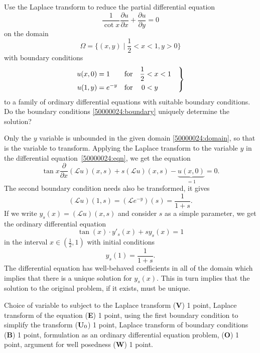 Use the Laplace transform to reduce the partial differential equation
\begin{equation}
\frac{1}{\cot x}
\frac{\partial u}{\partial x}
+
\frac{\partial u}{\partial y}
=
0
\label{50000024:eqn}
\end{equation}
on the domain
\begin{equation}
\Omega
=
\biggl\{
(x,y)\;\bigg|\; \frac12<x<1, y>0
\biggr\}
\label{50000024:domain}
\end{equation}
with boundary conditions
\begin{equation}
\left.
\begin{aligned}
u(x,0) &= 1 &&\text{for} & \frac12<\mathstrut&x<1
\\
u(1,y) &=e^{-y}&&\text{for}  & 0<\mathstrut&y
\end{aligned}
\quad
\right\}
\label{50000024:boundary}
\end{equation}
to a family of ordinary differential equations with suitable boundary
conditions.
Do the boundary conditions \eqref{50000024:boundary} uniquely determine
the solution?

\begin{loesung}
Only the $y$ variable is unbounded in the given domain
\eqref{50000024:domain}, so that is the variable to transform.
Applying the Laplace transform to the variable $y$ in the differential
equation~\eqref{50000024:eqn}, we get the equation
\[
\tan x \frac{\partial }{\partial x}
(\mathscr{L}u)(x,s)
+
s(\mathscr{L}u)(x,s)
-
\underbrace{u(x,0)}_{\displaystyle=1}
=0.
\]
The second boundary condition needs also be transformed, it gives
\[
(\mathscr{L}u)(1,s)
=
(\mathscr{L}e^{-y})(s)
=
\frac{1}{1+s}.
\]
If we write $y_s(x)=(\mathscr{L}u)(x,s)$ and consider $s$ as a simple
parameter, we get the ordinary differential equation
\begin{equation}
\tan(x)
\cdot
y'_s(x) 
+sy_s(x)
=
1
\end{equation}
in the interval $x\in(\frac12,1)$ with initial conditions
\[
y_s(1)
=
\frac{1}{1+s}.
\]
The differential equation has well-behaved coefficients in all of the
domain which implies that there is a unique solution for $y_s(x)$.
This in turn implies that the solution to the original problem, if it
exists, must be unique.
\end{loesung}

\begin{bewertung}
Choice of variable to subject to the Laplace transform ({\bf V}) 1 point,
Laplace transform of the equation ({\bf E}) 1 point,
using the first boundary condition to simplify the transform
({\bf U}$\mathstrut_0$) 1 point,
Laplace transform of boundary conditions ({\bf B}) 1 point,
formulation as an ordinary differential equation problem, ({\bf O}) 1 point,
argument for well posedness ({\bf W}) 1 point.
\end{bewertung}

